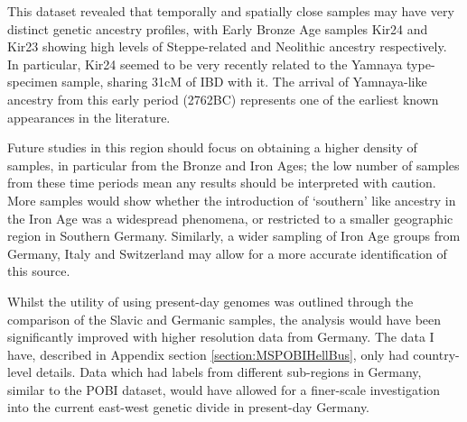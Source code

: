 This dataset revealed that temporally and spatially close samples may have very distinct genetic ancestry profiles, with Early Bronze Age samples Kir24 and Kir23 showing high levels of Steppe-related and Neolithic ancestry respectively. In particular, Kir24 seemed to be very recently related to the Yamnaya type-specimen sample, sharing 31cM of IBD with it. The arrival of Yamnaya-like ancestry from this early period (2762BC) represents one of the earliest known appearances in the literature. 

Future studies in this region should focus on obtaining a higher density of samples, in particular from the Bronze and Iron Ages; the low number of samples from these time periods mean any results should be interpreted with caution. More samples would show whether the introduction of `southern' like ancestry in the Iron Age was a widespread phenomena, or restricted to a smaller geographic region in Southern Germany. Similarly, a wider sampling of Iron Age groups from Germany, Italy and Switzerland may allow for a more accurate identification of this source.

Whilst the utility of using present-day genomes was outlined through the comparison of the Slavic and Germanic samples, the analysis would have been significantly improved with higher resolution data from Germany. The data I have, described in Appendix section \ref{section:MSPOBIHellBus}, only had country-level details. Data which had labels from different sub-regions in Germany, similar to the POBI dataset, would have allowed for a finer-scale investigation into the current east-west genetic divide in present-day Germany.    


